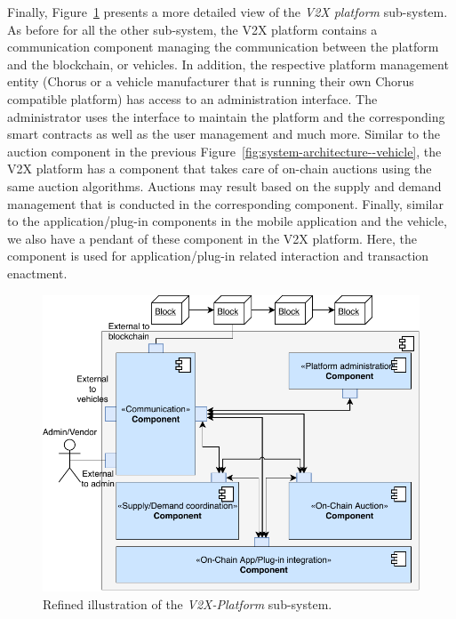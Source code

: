 \documentclass{llncs}
\begin{document}
{				Finally, Figure~\ref{fig:system-architecture--platform} presents a more detailed view of the \textit{V2X platform} sub-system. As before for all the other sub-system, the V2X platform contains a communication component managing the communication between the platform and the blockchain, or vehicles. In addition, the respective platform management entity (Chorus or a vehicle manufacturer that is running their own Chorus compatible platform) has access to an administration interface. The administrator uses the interface to maintain the platform and the corresponding smart contracts as well as the user management and much more. Similar to the auction component in the previous Figure~\ref{fig:system-architecture--vehicle}, the V2X platform has a component that takes care of on-chain auctions using the same auction algorithms. Auctions may result based on the supply and demand management that is conducted in the corresponding component. Finally, similar to the application/plug-in components in the mobile application and the vehicle, we also have a pendant of these component in the V2X platform. Here, the component is used for application/plug-in related interaction and transaction enactment.
				
				\begin{figure}
					\centering
					\includegraphics[scale=0.75]{Figures/longterm-architecture/20180507_Refined-sys-architecture--V2X.pdf}
					\caption{Refined illustration of the \textit{V2X-Platform} sub-system.}	
					\label{fig:system-architecture--platform}
				\end{figure}						

}
\end{document}
